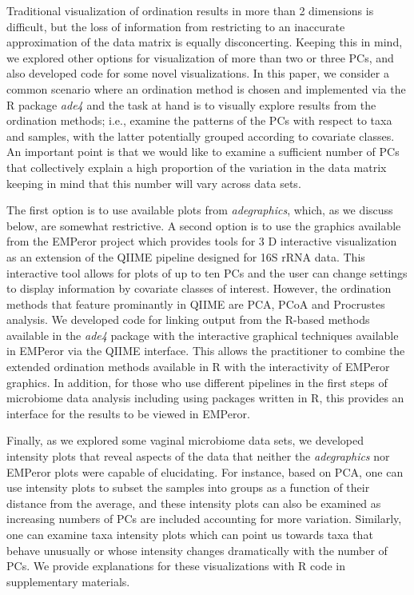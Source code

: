 \documentclass[doublespacing]{bmcart}
\begin{document}
Traditional visualization of ordination results in more than 2 dimensions is difficult, but the loss of information from restricting to an inaccurate approximation of the data matrix is equally disconcerting. Keeping this in mind, we explored other options for visualization of more than two or three PCs, and also developed code for some novel visualizations. In this paper, we consider a common scenario where an ordination method is chosen and implemented via the R package {\it ade4}  \cite{Dray1, Dray2, Chessel} and the task at hand is to visually explore results from the ordination methods; i.e., examine the patterns of the PCs with respect to taxa and samples, with the latter potentially grouped according to covariate classes. An important point is that we would like to examine a sufficient number of PCs that collectively explain a high proportion of the variation in the data matrix keeping in mind that this number will vary across data sets. 

The first option is to use available plots from {\it adegraphics}, which, as we discuss below, are somewhat restrictive. A second option is to use the graphics available from the EMPeror project \cite{emperor} which provides tools for 3 D interactive visualization as an extension of the QIIME \cite{qiime} pipeline designed for 16S rRNA data. This interactive tool allows for plots of up to ten PCs and the user can change settings to display information by covariate classes of interest. However, the ordination methods that feature prominantly in QIIME are PCA,  PCoA and Procrustes analysis. We developed code for linking output from the R-based methods available in the {\it ade4} package with the interactive graphical techniques available in EMPeror via the QIIME interface. This allows the practitioner to combine the extended ordination methods available in R with the interactivity of EMPeror graphics. In addition, for those who use different pipelines in the first steps of microbiome data analysis including using packages written in R, this provides an interface for the results to be viewed in EMPeror.

Finally, as we explored some vaginal microbiome data sets, we developed intensity plots that reveal aspects of the data that neither the {\it adegraphics} nor EMPeror plots were capable of elucidating. For instance, based on PCA, one can use intensity plots to subset the samples into groups as a function of their distance from the average, and these intensity plots can also be examined as increasing numbers of PCs are included accounting for more variation. Similarly, one can examine taxa intensity plots which can point us towards taxa that behave unusually or whose intensity changes dramatically with the number of PCs. We provide explanations for these visualizations with R code in supplementary materials. 
\end{document}
